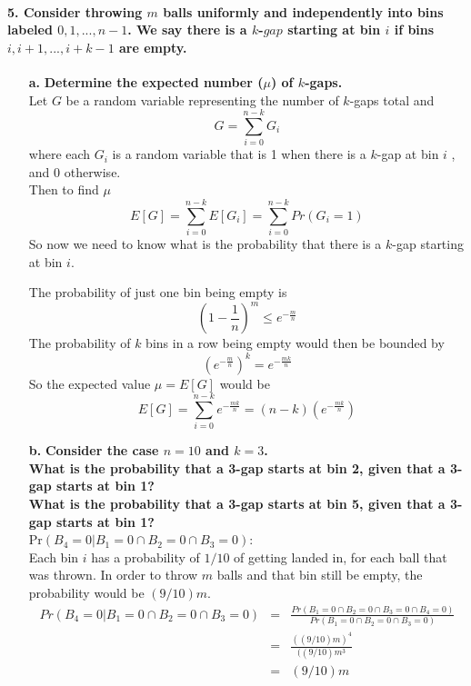 \documentclass{article}
\begin{document}
\paragraph{5. Consider throwing $m$ balls uniformly and independently into bins 
labeled $0, 1,..., n-1$. We say there is a $k$-$gap$ starting at bin $i$ if 
bins 
$i, i + 1,..., i + k-1$ are empty.}
\begin{enumerate}
\item[\textbf{a.}] \textbf{Determine the expected number ($\mu$) of $k$-gaps.}\\

Let $G$ be a random variable representing the number of $k$-gaps total and
\begin{equation*}
G = \sum_{i=0}^{n-k} G_i
\end{equation*}
where each $G_i$ is a random variable that is 1 when there is a $k$-gap at bin 
$i$
, and 0 otherwise.\\
Then to find $\mu$
\begin{equation*}
E[G] = \sum_{i=0}^{n-k} E[G_i] = \sum_{i=0}^{n-k} Pr(G_i=1)
\end{equation*}
So now we need to know what is the probability that there is a $k$-gap starting
at bin $i$.

The probability of just one bin being empty is
\begin{equation*}
\left(1-\frac{1}{n}\right)^m \leq e^{-\frac{m}{n}}
\end{equation*}
The probability of $k$ bins in a row being empty would then be bounded by 
\begin{equation*}
(e^{-{\frac{m}{n}}})^k = e^{-\frac{mk}{n}}
\end{equation*}
So the expected value $\mu = E[G]$ would be
\begin{equation*}
E[G] = \sum_{i=0}^{n-k} e^{-\frac{mk}{n}} = (n-k)(e^{-\frac{mk}{n}})
\end{equation*}

\item[\textbf{b.}] \textbf{Consider the case $n = 10$ and $k = 3$.\\ 
What is the probability that a 3-gap starts at bin 2, given that a 3-gap 
starts at bin 1?\\ 			
What is the probability that a 3-gap starts at bin 5, given that a 3-gap 
starts at bin 1?}\\

Pr$(B_4=0|B_1=0\cap B_2=0\cap B_3=0)$:\\
Each bin $i$ has a probability of $1/10$ of getting landed in, for each ball 
that was thrown. In order to throw $m$ balls and that bin still be empty, the 
probability would be $(9/10)m$.
\begin{eqnarray*}
Pr(B_4=0|B_1=0\cap B_2=0\cap B_3=0) & = & \frac{Pr(B_1=0\cap B_2=0\cap 
B_3=0\cap 
B_4=0)}{Pr(B_1=0\cap B_2=0\cap B_3=0)}\\
 & = & \frac{((9/10)m)^4}{((9/10)m^3}\\
 & = & (9/10)m
\end{eqnarray*}


\end{enumerate}
\end{document}
